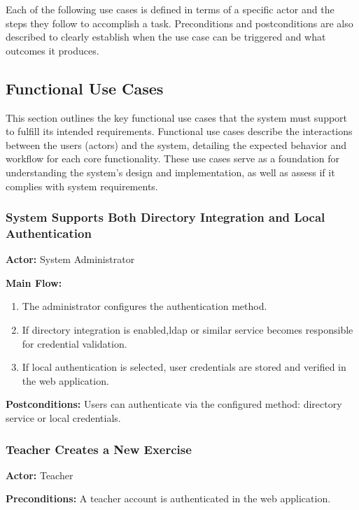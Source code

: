         Each of the following use cases is defined in terms of a specific actor and the steps they follow to accomplish a task. Preconditions 
        and postconditions are also described to clearly establish when the use case can be triggered and what outcomes it produces.

    \subsection{Functional Use Cases}

        This section outlines the key functional use cases that the system must support to fulfill its intended requirements. 
        Functional use cases describe the interactions between the users (actors) and the system, detailing the expected 
        behavior and workflow for each core functionality. These use cases serve as a foundation for understanding the system's 
        design and implementation, as well as assess if it complies with system requirements.

        \subsubsection{System Supports Both Directory Integration and Local Authentication}
            \textbf{Actor:} System Administrator

            \textbf{Main Flow:}
            \begin{enumerate}
                \item The administrator configures the authentication method.
                \item If directory integration is enabled,\ac{ldap} or similar service becomes responsible for credential validation.
                \item If local authentication is selected, user credentials are stored and verified in the web application.
            \end{enumerate}

            \textbf{Postconditions:} Users can authenticate via the configured method: directory service or local credentials.


        \subsubsection{Teacher Creates a New Exercise}
        \label{sec:new_exercise}
            \textbf{Actor:} Teacher

            \textbf{Preconditions:} A teacher account is authenticated in the web application.

